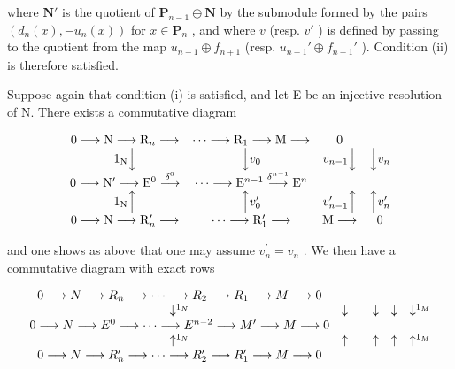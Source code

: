 where \(\mathbf{N}'\) is the quotient of \(\mathbf{P}_{n-1} \oplus \mathbf{N}\) by the submodule formed by the pairs \((d_n(x), -u_n(x))\) for \(x \in \mathbf{P}_n\) , and where \(v\) (resp. \(v'\) ) is defined by passing to the quotient from the map \(u_{n-1} \oplus f_{n+1}\) (resp. \(u_{n-1}' \oplus f_{n+1}'\) ). Condition (ii) is therefore satisfied.

Suppose again that condition (i) is satisfied, and let E be an injective resolution of N. There exists a commutative diagram

\[
\begin{array}{c c c c c c c} 0 \longrightarrow \mathrm{N} \longrightarrow \mathrm{R} _ {n} \longrightarrow & \dots \longrightarrow \mathrm{R} _ {1} \longrightarrow \mathrm{M} \longrightarrow & 0 \\ 1 _ {\mathrm{N}} \Big \downarrow & \Big \downarrow v _ {0} & v _ {n - 1} \Big \downarrow & \Big \downarrow v _ {n} \\ 0 \longrightarrow \mathrm{N} ^ {\prime} \longrightarrow \mathrm{E} ^ {0} \stackrel {{\delta^ {0}}} {{\longrightarrow}} & \dots \longrightarrow \mathrm{E} ^ {n - 1} \stackrel {{\delta^ {n - 1}}} {{\longrightarrow}} \mathrm{E} ^ {n} \\ 1 _ {\mathrm{N}} \Big \uparrow & \Big \uparrow v _ {0} ^ {\prime} & v _ {n - 1} ^ {\prime} \Big \uparrow & \Big \uparrow v _ {n} ^ {\prime} \\ 0 \longrightarrow \mathrm{N} \longrightarrow \mathrm{R} _ {n} ^ {\prime} \longrightarrow & \dots \longrightarrow \mathrm{R} _ {1} ^ {\prime} \longrightarrow & \mathrm{M} \longrightarrow & 0 \end{array}
\]

and one shows as above that one may assume \(v_{n}^{\prime}=v_{n}\) . We then have a commutative diagram with exact rows

\[
\begin{array}{c c c c c c c c} 0 \longrightarrow N \longrightarrow R _ {n} \longrightarrow \dots \longrightarrow R _ {2} \longrightarrow R _ {1} \longrightarrow M \longrightarrow 0 \\ \downarrow^ {1 _ {N}} & \downarrow & & \downarrow & \downarrow & \downarrow^ {1 _ {M}} \\ 0 \longrightarrow N \longrightarrow E ^ {0} \longrightarrow \dots \longrightarrow E ^ {n - 2} \longrightarrow M ^ {\prime} \longrightarrow M \longrightarrow 0 \\ \uparrow^ {1 _ {N}} & \uparrow & & \uparrow & \uparrow & \uparrow^ {1 _ {M}} \\ 0 \longrightarrow N \longrightarrow R _ {n} ^ {\prime} \longrightarrow \dots \longrightarrow R _ {2} ^ {\prime} \longrightarrow R _ {1} ^ {\prime} \longrightarrow M \longrightarrow 0 \end{array}
\]

